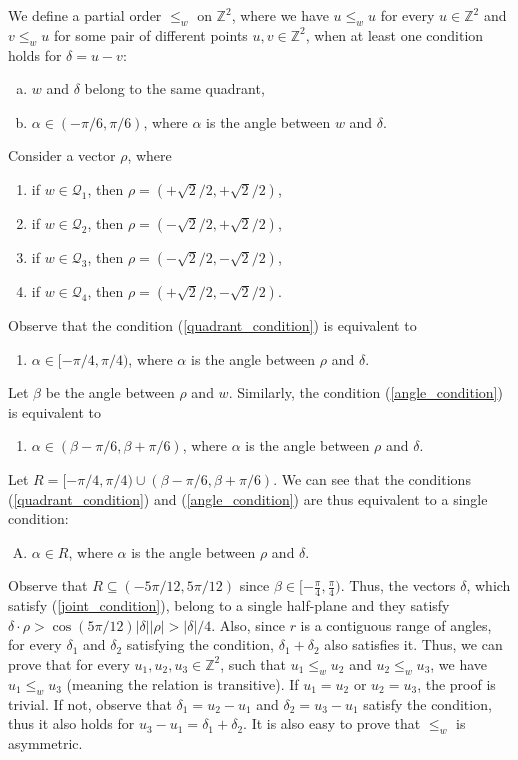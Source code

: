 \documentclass[11pt, letterpaper]{article}
\theoremstyle{plain}
\theoremstyle{definition}
\theoremstyle{remark}
\newcommand{\Z}{\mathbb{Z}}
\newcommand{\Q}{\mathcal{Q}}
\begin{document}
We define a partial order $\le_{w}$ on $\Z^2$, where we have $u \le_w u$ for every $u \in \Z^2$ and $v \le_w u$ for some pair of different points $u, v \in \Z^2$, when at least one condition holds for $\delta = u - v$:
\begin{enumerate}[a)]
	\item $w$ and $\delta$ belong to the same quadrant, \label{quadrant_condition}
	\item $\alpha \in (-\pi / 6, \pi / 6)$, where $\alpha$ is the angle between $w$ and $\delta$. \label{angle_condition}
\end{enumerate}
Consider a vector $\rho$, where
\begin{enumerate}[$1^\circ$]
	\item if $w \in \Q_1$, then $\rho = (+\sqrt{2} / 2, +\sqrt{2} / 2)$,
	\item if $w \in \Q_2$, then $\rho = (-\sqrt{2} / 2, +\sqrt{2} / 2)$,
	\item if $w \in \Q_3$, then $\rho = (-\sqrt{2} / 2, -\sqrt{2} / 2)$,
	\item if $w \in \Q_4$, then $\rho = (+\sqrt{2} / 2, -\sqrt{2} / 2)$.
\end{enumerate}
Observe that the condition (\ref{quadrant_condition}) is equivalent to
\begin{enumerate}[a')]
	\item $\alpha \in [-\pi / 4, \pi / 4)$, where $\alpha$ is the angle between $\rho$ and $\delta$.
\end{enumerate}
Let $\beta$ be the angle between $\rho$ and $w$. Similarly, the condition (\ref{angle_condition}) is equivalent to
\begin{enumerate}[b')]
	\item $\alpha \in (\beta - \pi / 6, \beta + \pi / 6)$, where $\alpha$ is the angle between $\rho$ and $\delta$. 
\end{enumerate}
Let $R = [-\pi / 4, \pi / 4) \cup (\beta - \pi / 6, \beta + \pi / 6)$. 
We can see that the conditions (\ref{quadrant_condition}) and (\ref{angle_condition}) are thus equivalent to a single condition:
\begin{enumerate}[A)]
	\item $\alpha \in R$, where $\alpha$ is the angle between $\rho$ and $\delta$. \label{joint_condition}
\end{enumerate}
Observe that $R \subseteq (-5 \pi / 12, 5 \pi / 12)$ since $\beta \in [-\frac{\pi}{4}, \frac{\pi}{4})$.
Thus, the vectors $\delta$, which satisfy (\ref{joint_condition}), belong to a single half-plane and they satisfy $\delta \cdot \rho > \cos(5\pi / 12)|\delta||\rho| > |\delta| / 4$.
Also, since $r$ is a contiguous range of angles, for every $\delta_1$ and $\delta_2$ satisfying the condition, $\delta_1 + \delta_2$ also satisfies it.
Thus, we can prove that for every $u_1, u_2, u_3 \in \Z^2$, such that $u_1 \le_w u_2$ and $u_2 \le_w u_3$, we have $u_1 \le_w u_3$ (meaning the relation is transitive).
If $u_1 = u_2$ or $u_2 = u_3$, the proof is trivial.
If not, observe that $\delta_1 = u_2 - u_1$ and $\delta_2 = u_3 - u_1$ satisfy the condition, 
thus it also holds for $u_3 - u_1 = \delta_1 + \delta_2$.
It is also easy to prove that $\le_w$ is asymmetric.
\end{document}
